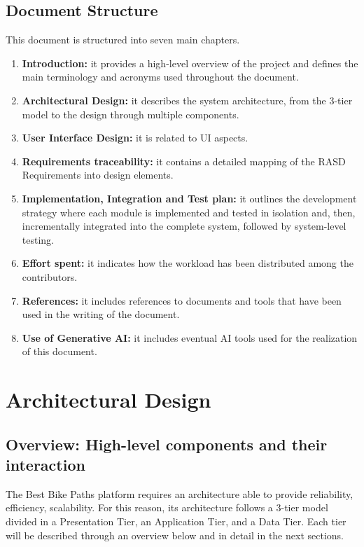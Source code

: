 \documentclass{Configuration_Files/PoliMi3i_thesis}
\begin{document}
\section{Document Structure}
    This document is structured into seven main chapters.
    \begin{enumerate}
        \item \textbf{Introduction:} it provides a high-level overview of the project and defines the main terminology and acronyms used throughout the document.
        \item \textbf{Architectural Design:} it describes the system architecture, from the 3-tier model to the design through multiple components.
        \item \textbf{User Interface Design:} it is related to UI aspects.
        \item \textbf{Requirements traceability:} it contains a detailed mapping of the RASD Requirements into design elements.
        \item \textbf{Implementation, Integration and Test plan:} it outlines the development strategy where each module is implemented and tested in isolation and, then, incrementally integrated into the complete system, followed by system-level testing.
        \item \textbf{Effort spent:} it indicates how the workload has been distributed among the contributors.
        \item \textbf{References:} it includes references to documents and tools that have been used in the writing of the document. 
        \item \textbf{Use of Generative AI: } it includes eventual AI tools used for the realization of this document.
    \end{enumerate}

\chapter{Architectural Design}

\section{Overview: High-level components and their interaction}
The Best Bike Paths platform requires an architecture able to provide reliability, efficiency, scalability. For this reason, its architecture follows a 3-tier model divided in a Presentation Tier, an Application Tier, and a Data Tier. Each tier will be described through an overview below and in detail in the next sections.
\end{document}
